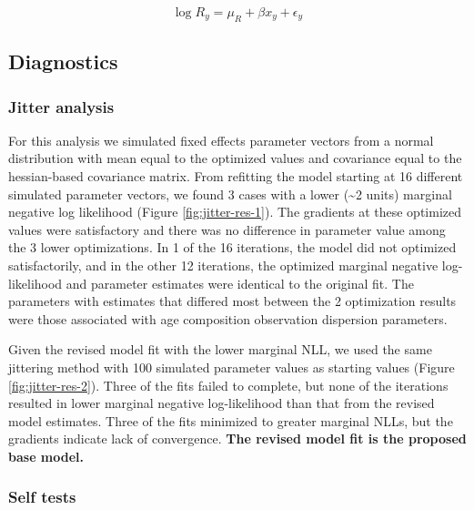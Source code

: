 \documentclass[
]{article}
\begin{document}
\begin{equation}\label{eq:expected-recruitment}
\log R_y = \mu_R + \beta x_y + \epsilon_y
\end{equation}

\hypertarget{diagnostics}{%
\subsection{Diagnostics}\label{diagnostics}}

\hypertarget{jitter-analysis}{%
\subsubsection{Jitter analysis}\label{jitter-analysis}}

For this analysis we simulated fixed effects parameter vectors from a normal distribution with mean equal to the optimized values and covariance equal to the hessian-based covariance matrix. From refitting the model starting at 16 different simulated parameter vectors, we found 3 cases with a lower (\textasciitilde2 units) marginal negative log likelihood (Figure \ref{fig:jitter-res-1}). The gradients at these optimized values were satisfactory and there was no difference in parameter value among the 3 lower optimizations. In 1 of the 16 iterations, the model did not optimized satisfactorily, and in the other 12 iterations, the optimized marginal negative log-likelihood and parameter estimates were identical to the original fit. The parameters with estimates that differed most between the 2 optimization results were those associated with age composition observation dispersion parameters.

Given the revised model fit with the lower marginal NLL, we used the same jittering method with 100 simulated parameter values as starting values (Figure \ref{fig:jitter-res-2}). Three of the fits failed to complete, but none of the iterations resulted in lower marginal negative log-likelihood than that from the revised model estimates. Three of the fits minimized to greater marginal NLLs, but the gradients indicate lack of convergence. \textbf{The revised model fit is the proposed base model.}

\hypertarget{self-tests}{%
\subsubsection{Self tests}\label{self-tests}}
\end{document}
